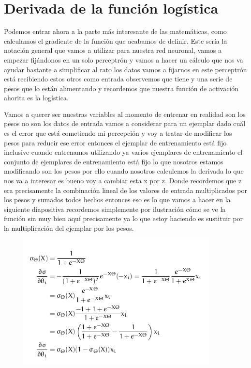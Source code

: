 \section{Derivada de la función logística}

Podemos entrar ahora a la parte más interesante de las matemáticas, como calculamos el gradiente de la función que acabamos de definir. Este sería la notación general que vamos a utilizar para nuestra red neuronal, vamos a empezar  fijándonos en un solo perceptrón y vamos a hacer un cálculo que nos va ayudar bastante a simplificar al rato los datos vamos a fijarnos en este perceptrón está recibiendo estos otros como entrada observemos que tiene y una serie de pesos que lo están alimentando y recordemos que nuestra función de activación ahorita es la logística.

Vamos a querer ser nuestras variables al momento de entrenar en realidad son los pesos no son los datos de entrada vamos a considerar para un ejemplar dado cuál es el error que está cometiendo mi percepción y voy a tratar de modificar los pesos para reducir ese error entonces el ejemplar de entrenamiento está fijo inclusive cuando entrenamos utilizando ya varios ejemplares de entrenamiento el conjunto de ejemplares de entrenamiento está fijo lo que nosotros estamos modificando son los pesos por ello cuando nosotros calculemos la derivada lo que nos va a interesar es bueno voy a cambiar esta x por z. Donde recordemos que z era precisamente la combinación lineal de los valores de entrada multiplicados por los pesos y sumados todos hechos entonces eso es lo que vamos a hacer en la siguiente diapositiva recordemos simplemente por ilustración cómo se ve la función sin muy bien aquí precisamente ya lo que estoy haciendo es sustituir por la multiplicación del ejemplar por los pesos.

\begin{figure}[h]
 \centering
 \includegraphics[scale=0.5]{../Figuras/ecuaciones.png}
 \label{fig:graficaLog}
\end{figure}

